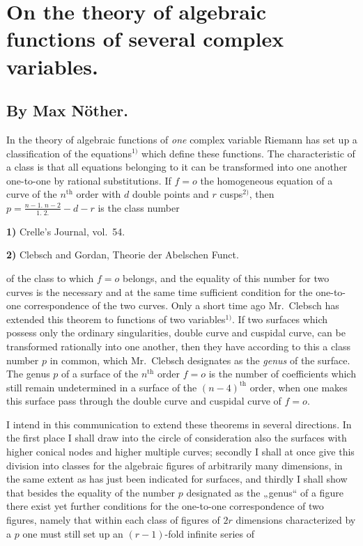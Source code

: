 \documentclass{article}
\begin{document}

\section*{On the theory of algebraic functions of several complex variables.}

\subsection*{By Max Nöther.}

In the theory of algebraic functions of \emph{one} complex variable Riemann has set up a classification of the equations${}^{1)}$ which define these functions. The characteristic of a class is that all equations belonging to it can be transformed into one another one-to-one by rational substitutions. If $f = o$ the homogeneous equation of a curve of the $n^{\text{th}}$ order with $d$ double points and $r$ cusps${}^{2)}$, then $p = \frac{n-1.\; n-2}{1.\; 2.} - d - r$ is the class number

\textbf{1)} Crelle's Journal, vol.\ 54.

\textbf{2)} Clebsch and Gordan, Theorie der Abelschen Funct.

of the class to which $f = o$ belongs, and the equality of this number for two curves is the necessary and at the same time sufficient condition for the one-to-one correspondence of the two curves. Only a short time ago Mr.\ Clebsch has extended this theorem to functions of two variables${}^{1)}$. If two surfaces which possess only the ordinary singularities, double curve and cuspidal curve, can be transformed rationally into one another, then they have according to this a class number $p$ in common, which Mr.\ Clebsch designates as the \emph{genus} of the surface. The genus $p$ of a surface of the $n^{\text{th}}$ order $f = o$ is the number of coefficients which still remain undetermined in a surface of the $(n-4)^{\text{th}}$ order, when one makes this surface pass through the double curve and cuspidal curve of $f = o$.

I intend in this communication to extend these theorems in several directions. In the first place I shall draw into the circle of consideration also the surfaces with higher conical nodes and higher multiple curves; secondly I shall at once give this division into classes for the algebraic figures of arbitrarily many dimensions, in the same extent as has just been indicated for surfaces, and thirdly I shall show that besides the equality of the number $p$ designated as the „genus“ of a figure there exist yet further conditions for the one-to-one correspondence of two figures, namely that within each class of figures of $2r$ dimensions characterized by a $p$ one must still set up an $(r-1)$-fold infinite series of
\end{document}
